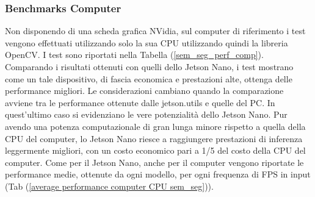 \subsubsection{Benchmarks Computer}
Non disponendo di una scheda grafica NVidia, sul computer di riferimento i 
test vengono effettuati utilizzando solo la sua CPU utilizzando quindi la 
libreria OpenCV. I test sono riportati nella Tabella (\ref{sem_seg_perf_comp}). Comparando 
i risultati ottenuti con quelli dello Jetson Nano, i test mostrano come 
un tale dispositivo, di fascia economica e prestazioni alte, ottenga delle 
performance migliori. Le considerazioni cambiano quando la comparazione 
avviene tra le performance ottenute dalle jetson.utils e quelle del PC. In 
quest'ultimo caso si evidenziano le vere potenzialità dello Jetson Nano. Pur 
avendo una potenza computazionale di gran lunga minore rispetto a quella 
della CPU del computer, lo Jetson Nano riesce a raggiungere prestazioni di inferenza 
leggermente migliori, con un costo economico pari a 1/5 del costo della CPU 
del computer. Come per il Jetson Nano, anche per il computer vengono 
riportate le performance medie, ottenute da ogni modello, per ogni frequenza 
di FPS in input (Tab (\ref{average performance computer CPU sem_seg})).


